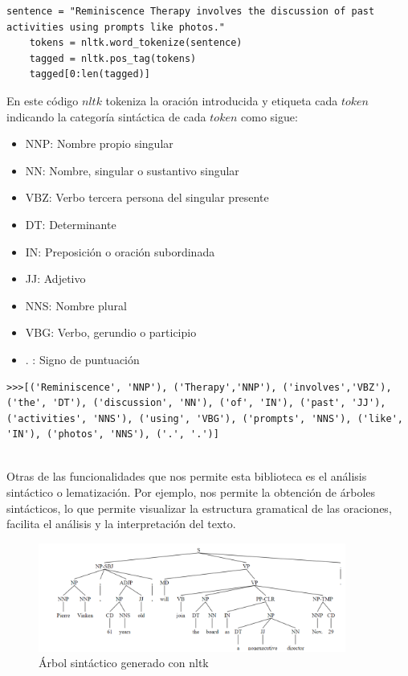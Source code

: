 \begin{lstlisting}[style=SpyderStyle, caption={Ejemplo de código en Python. Se pueden consultar más ejemplos en \cite{bird2009natural}}, captionpos=b, label={lst:python},breaklines = true]
	sentence = "Reminiscence Therapy involves the discussion of past activities using prompts like photos."
	tokens = nltk.word_tokenize(sentence)
	tagged = nltk.pos_tag(tokens)
	tagged[0:len(tagged)]
\end{lstlisting}

En este código $nltk$ tokeniza la oración introducida y etiqueta cada $token$ indicando la categoría sintáctica de cada $token$ como sigue:

\begin{itemize}
	\item NNP: Nombre propio singular
	\item NN: Nombre, singular o sustantivo singular
	\item VBZ: Verbo tercera persona del singular presente
	\item DT: Determinante
	\item IN: Preposición o oración subordinada
	\item JJ: Adjetivo
	\item NNS: Nombre plural 
	\item VBG: Verbo, gerundio o participio
	\item . : Signo de puntuación
\end{itemize}

\begin{lstlisting}[style=SpyderStyle, caption={Tokenización y etiquetado con nltk}, captionpos=b, label={lst:python},breaklines = true]
	>>>[('Reminiscence', 'NNP'), ('Therapy','NNP'), ('involves','VBZ'), ('the', 'DT'), ('discussion', 'NN'), ('of', 'IN'), ('past', 'JJ'), ('activities', 'NNS'), ('using', 'VBG'), ('prompts', 'NNS'), ('like', 'IN'), ('photos', 'NNS'), ('.', '.')]
	
\end{lstlisting}

Otras de las funcionalidades que nos permite esta biblioteca es el análisis sintáctico o lematización. Por ejemplo, nos permite la obtención de árboles sintácticos, lo que permite visualizar la estructura gramatical de las oraciones, facilita el análisis y la interpretación del texto. \\

\begin{figure}[h]
	\centering
	\includegraphics[width=0.9\textwidth]{Imagenes/arbolsintactico}
	\caption{Árbol sintáctico generado con nltk}
	\label{fig:2}
\end{figure}

